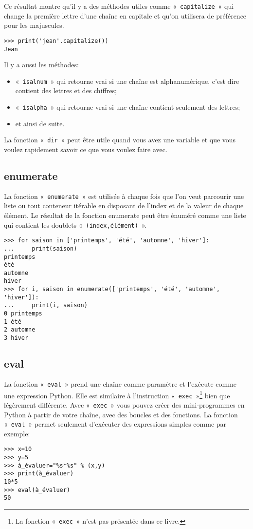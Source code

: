 Ce résultat montre qu'il y a des méthodes utiles comme «~\texttt{capitalize}~» qui change la première lettre d'une chaîne en capitale et qu'on utilisera de préférence pour les majuscules.

\begin{Verbatim}[frame=single,rulecolor=\color{gray}]
>>> print('jean'.capitalize())
Jean
\end{Verbatim}

Il y a aussi les méthodes:
\begin{itemize} 
\item «~\texttt{isalnum}~» qui retourne vrai si une chaîne est alphanumérique, c'est dire contient des lettres et des chiffres;
\item «~\texttt{isalpha}~» qui retourne vrai si une chaîne contient seulement des lettres;
\item et ainsi de suite.
\end{itemize}  

La fonction «~\texttt{dir}~» peut être utile quand vous avez une variable et que vous voulez rapidement savoir ce que vous voulez faire avec.


\subsection*{enumerate}
La fonction «~\texttt{enumerate}~» est utilisée à chaque fois que l'on veut parcourir une liste ou tout conteneur itérable en disposant de l'index et de la valeur de chaque élément. Le résultat de la fonction enumerate peut être énuméré comme une liste qui contient les doublets «~\texttt{(index,élément)}~». 

\begin{Verbatim}[frame=single,rulecolor=\color{gray}]
>>> for saison in ['printemps', 'été', 'automne', 'hiver']:
...     print(saison)
printemps
été
automne
hiver
>>> for i, saison in enumerate(['printemps', 'été', 'automne', 'hiver']):
...     print(i, saison)
0 printemps
1 été
2 automne
3 hiver
\end{Verbatim}


\subsection*{eval}

La fonction «~\texttt{eval}~» prend une chaîne comme paramètre et l'exécute comme une expression Python. Elle est similaire à l'instruction «~\texttt{exec}~»\footnote{La fonction «~\texttt{exec}~» n'est pas présentée dans ce livre.} bien que légèrement différente. Avec «~\texttt{exec}~» vous pouvez créer des mini-programmes en Python à partir de votre chaîne, avec des boucles et des fonctions. La fonction «~\texttt{eval}~» permet seulement d'exécuter des expressions simples comme par exemple:
\begin{Verbatim}[frame=single,rulecolor=\color{gray}]
>>> x=10
>>> y=5
>>> à_évaluer="%s*%s" % (x,y)
>>> print(à_évaluer)
10*5
>>> eval(à_évaluer)
50
\end{Verbatim}

